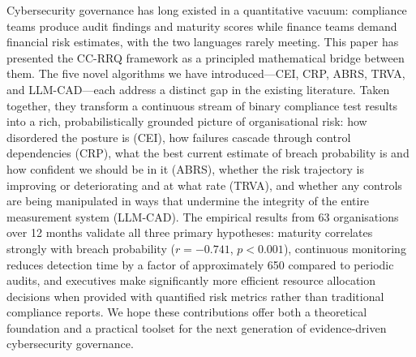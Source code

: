 \documentclass[conference]{IEEEtran}
\begin{document}
Cybersecurity governance has long existed in a quantitative vacuum: compliance
teams produce audit findings and maturity scores while finance teams demand
financial risk estimates, with the two languages rarely meeting. This paper
has presented the CC-RRQ framework as a principled mathematical bridge between
them.
The five novel algorithms we have introduced---CEI, CRP, ABRS, TRVA, and
LLM-CAD---each address a distinct gap in the existing literature. Taken
together, they transform a continuous stream of binary compliance test results
into a rich, probabilistically grounded picture of organisational risk: how
disordered the posture is (CEI), how failures cascade through control
dependencies (CRP), what the best current estimate of breach probability is
and how confident we should be in it (ABRS), whether the risk trajectory is
improving or deteriorating and at what rate (TRVA), and whether any controls
are being manipulated in ways that undermine the integrity of the entire
measurement system (LLM-CAD).
The empirical results from 63 organisations over 12 months validate all three
primary hypotheses: maturity correlates strongly with breach probability
($r = -0.741$, $p < 0.001$), continuous monitoring reduces detection time by a
factor of approximately 650 compared to periodic audits, and executives make
significantly more efficient resource allocation decisions when provided with
quantified risk metrics rather than traditional compliance reports.
We hope these contributions offer both a theoretical foundation and a practical
toolset for the next generation of evidence-driven cybersecurity governance.
\end{document}
